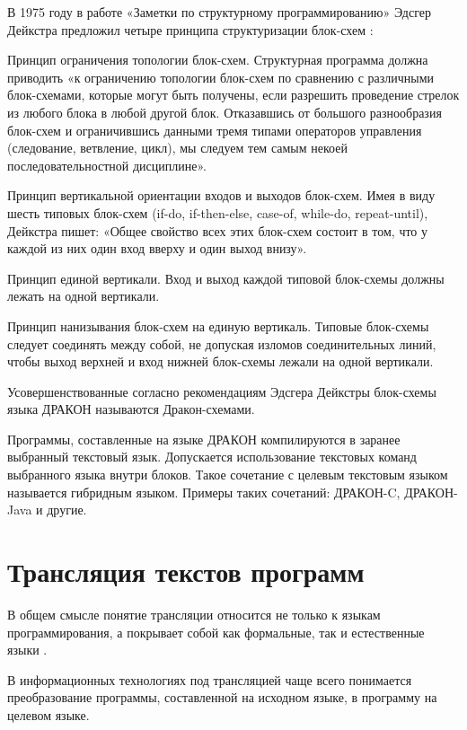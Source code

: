 В 1975 году в работе «Заметки по структурному программированию» Эдсгер Дейкстра предложил четыре принципа структуризации блок-схем \cite{deixtra}:
\begin{enumerate*}
	\item Принцип ограничения топологии блок-схем. Структурная программа должна приводить «к ограничению топологии блок-схем по сравнению с различными блок-схемами, которые могут быть получены, если разрешить проведение стрелок из любого блока в любой другой блок. Отказавшись от большого разнообразия блок-схем и ограничившись данными тремя типами операторов управления (следование, ветвление, цикл), мы следуем тем самым некоей последовательностной дисциплине».
	\item Принцип вертикальной ориентации входов и выходов блок-схем. Имея в виду шесть типовых блок-схем (if-do, if-then-else, case-of, while-do, repeat-until), Дейкстра пишет: «Общее свойство всех этих блок-схем состоит в том, что у каждой из них один вход вверху и один выход внизу».
	\item Принцип единой вертикали. Вход и выход каждой типовой блок-схемы должны лежать на одной вертикали.
	\item Принцип нанизывания блок-схем на единую вертикаль. Типовые блок-схемы следует соединять между собой, не допуская изломов соединительных линий, чтобы выход верхней и вход нижней блок-схемы лежали на одной вертикали.
\end{enumerate*}

Усовершенствованные согласно рекомендациям Эдсгера Дейкстры блок-схемы языка ДРАКОН называются Дракон-схемами.

Программы, составленные на языке ДРАКОН компилируются в заранее выбранный текстовый язык. Допускается использование текстовых команд выбранного языка внутри блоков. Такое сочетание с целевым текстовым языком называется гибридным языком. Примеры таких сочетаний: ДРАКОН-C, ДРАКОН-Java и другие.

\section{Трансляция текстов программ}
В общем смысле понятие трансляции относится не только к языкам программирования, а покрывает собой как формальные, так и естественные языки \cite{trans-dict}.

В информационных технологиях под трансляцией чаще всего понимается преобразование программы, составленной на исходном языке, в программу на целевом языке.

